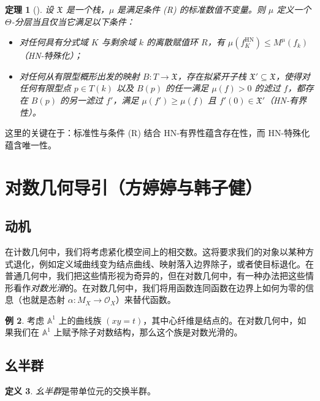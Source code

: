 \documentclass{amsart}
\newtheorem{thm}{定理}[section]
\theoremstyle{definition}
\newtheorem{defn}[thm]{定义}
\newtheorem{exm}[thm]{例}
\theoremstyle{remark}
\theoremstyle{plain}
\theoremstyle{definition}
\theoremstyle{remark}
\newcommand{\A}{\mathbb{A}}
\newcommand{\mc}[1]{\mathcal{#1}}
\newcommand{\mf}[1]{\mathfrak{#1}}
\newcommand{\mr}[1]{\mathrm{#1}}
\newcommand{\1}{\mathbf{1}}
\newcommand{\2}{\mathbf{2}}
\newcommand{\3}{\mathbf{3}}
\begin{document}
\begin{thm}[{\cite{HLinstability}}]
    设 \(\mf{X}\) 是一个栈，\(\mu\) 是满足条件 (R) 的标准数值不变量。则 \(\mu\) 定义一个 \(\Theta\)-分层当且仅当它满足以下条件：
    \begin{itemize}
        \item 对任何具有分式域 \(K\) 与剩余域 \(k\) 的离散赋值环 \(R\)，有 \(\mu(f_K^{\mr{HN}}) \leq M^{\mu}(f_k)\)（HN-特殊化）；
        \item 对任何从有限型概形出发的映射 \(B \colon T \to \mf{X}\)，存在拟紧开子栈 \(\mf{X}' \subseteq \mf{X}\)，使得对任何有限型点 \(p \in T(k)\) 以及 \(B(p)\) 的任一满足 \(\mu(f) > 0\) 的滤过 \(f\)，都存在 \(B(p)\) 的另一滤过 \(f'\)，满足 \(\mu(f') \geq \mu(f)\) 且 \(f'(0) \in \mf{X}'\)（HN-有界性）。
    \end{itemize}
\end{thm}

这里的关键在于：标准性与条件 (R) 结合 HN-有界性蕴含存在性，而 HN-特殊化蕴含唯一性。
\section{对数几何导引（方婷婷与韩子健）}%
\label{sec:Intro to log geometry (Tingting Fang and Zijian Han)}

\subsection{动机}%
\label{sub:Motivation}

在计数几何中，我们将考虑紧化模空间上的相交数。这将要求我们的对象以某种方式退化，例如定义域曲线变为结点曲线、映射落入边界除子，或者使目标退化。在普通几何中，我们把这些情形视为奇异的，但在对数几何中，有一种办法把这些情形看作\textit{对数光滑}的。在对数几何中，我们将用函数连同函数在边界上如何为零的信息（也就是态射 \(\alpha \colon M_X \to \mc{O}_X\)）来替代函数。

\begin{exm}
    考虑 \(\A^1\) 上的曲线族 \((xy=t)\)，其中心纤维是结点的。在对数几何中，如果我们在 \(\A^1\) 上赋予除子对数结构，那么这个族是对数光滑的。
\end{exm}

\subsection{幺半群}%
\label{sub:Monoids}

\begin{defn}
    \textit{幺半群}是带单位元的交换半群。
\end{defn}
\end{document}
